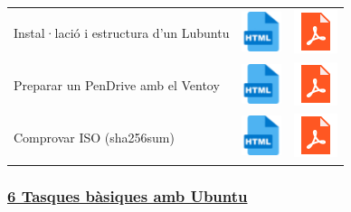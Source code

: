 \documentclass[
  12 pt,
  a4paper,
]{article}
\begin{document}
\begin{longtable}[]{@{}
  >{\raggedright\arraybackslash}p{}
  >{\raggedright\arraybackslash}p{}
  >{\raggedright\arraybackslash}p{}@{}}
\toprule\noalign{}
\endhead
\bottomrule\noalign{}
\endlastfoot
Instal·lació i estructura d'un Lubuntu &
\href{U5-INSTAL·LACIÓ_UBUNTU/U5-LUBUNTU_ESTRUCTURA.html}{\includegraphics{recursos/iconohtml.png}}
&
\href{U5-INSTAL·LACIÓ_UBUNTU/U5-LUBUNTU_ESTRUCTURA.pdf}{\includegraphics{recursos/iconopdf.png}} \\
Preparar un PenDrive amb el Ventoy &
\href{U5-INSTAL·LACIÓ_UBUNTU/U5-VENTOY.html}{\includegraphics{recursos/iconohtml.png}}
&
\href{U5-INSTAL·LACIÓ_UBUNTU/U5-VENTOY.pdf}{\includegraphics{recursos/iconopdf.png}} \\
Comprovar ISO (sha256sum) &
\href{U5-INSTAL·LACIÓ_UBUNTU/U5-SHA256SUM.html}{\includegraphics{recursos/iconohtml.png}}
&
\href{U5-INSTAL·LACIÓ_UBUNTU/U5-SHA256SUM.pdf}{\includegraphics{recursos/iconopdf.png}} \\
\end{longtable}

\subsubsection{\texorpdfstring{\hyperref[U6]{6 Tasques bàsiques amb
Ubuntu}}{6 Tasques bàsiques amb Ubuntu}}\label{tasques-buxe0siques-amb-ubuntu}
\end{document}
